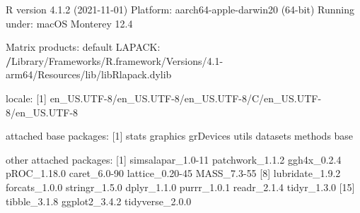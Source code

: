 \documentclass[
]{article}
\newenvironment{Shaded}{\begin{snugshade}}{\end{snugshade}}
\newcommand{\DecValTok}[1]{\textcolor[rgb]{0.00,0.00,0.81}{#1}}
\newcommand{\ErrorTok}[1]{\textcolor[rgb]{0.64,0.00,0.00}{\textbf{#1}}}
\newcommand{\FloatTok}[1]{\textcolor[rgb]{0.00,0.00,0.81}{#1}}
\newcommand{\FunctionTok}[1]{\textcolor[rgb]{0.00,0.00,0.00}{#1}}
\newcommand{\NormalTok}[1]{#1}
\newcommand{\SpecialCharTok}[1]{\textcolor[rgb]{0.00,0.00,0.00}{#1}}
\begin{document}
\begin{Shaded}
\begin{Highlighting}[]
\NormalTok{R version }\DecValTok{4}\NormalTok{.}\FloatTok{1.2}\NormalTok{ (}\DecValTok{2021{-}11{-}01}\NormalTok{)}
\NormalTok{Platform}\SpecialCharTok{:}\NormalTok{ aarch64}\SpecialCharTok{{-}}\NormalTok{apple}\SpecialCharTok{{-}}\FunctionTok{darwin20}\NormalTok{ (}\DecValTok{64}\SpecialCharTok{{-}}\NormalTok{bit)}
\NormalTok{Running under}\SpecialCharTok{:}\NormalTok{ macOS Monterey }\FloatTok{12.4}

\NormalTok{Matrix products}\SpecialCharTok{:}\NormalTok{ default}
\NormalTok{LAPACK}\SpecialCharTok{:} \ErrorTok{/}\NormalTok{Library}\SpecialCharTok{/}\NormalTok{Frameworks}\SpecialCharTok{/}\NormalTok{R.framework}\SpecialCharTok{/}\NormalTok{Versions}\SpecialCharTok{/}\FloatTok{4.1}\SpecialCharTok{{-}}\NormalTok{arm64}\SpecialCharTok{/}\NormalTok{Resources}\SpecialCharTok{/}\NormalTok{lib}\SpecialCharTok{/}\NormalTok{libRlapack.dylib}

\NormalTok{locale}\SpecialCharTok{:}
\NormalTok{[}\DecValTok{1}\NormalTok{] en\_US.UTF}\DecValTok{{-}8}\SpecialCharTok{/}\NormalTok{en\_US.UTF}\DecValTok{{-}8}\SpecialCharTok{/}\NormalTok{en\_US.UTF}\DecValTok{{-}8}\SpecialCharTok{/}\NormalTok{C}\SpecialCharTok{/}\NormalTok{en\_US.UTF}\DecValTok{{-}8}\SpecialCharTok{/}\NormalTok{en\_US.UTF}\DecValTok{{-}8}

\NormalTok{attached base packages}\SpecialCharTok{:}
\NormalTok{[}\DecValTok{1}\NormalTok{] stats     graphics  grDevices utils     datasets  methods   base     }

\NormalTok{other attached packages}\SpecialCharTok{:}
\NormalTok{ [}\DecValTok{1}\NormalTok{] simsalapar\_1}\FloatTok{.0}\DecValTok{{-}11}\NormalTok{ patchwork\_1.}\FloatTok{1.2}\NormalTok{   ggh4x\_0.}\FloatTok{2.4}\NormalTok{       pROC\_1.}\FloatTok{18.0}\NormalTok{       caret\_6}\FloatTok{.0}\DecValTok{{-}90}\NormalTok{      lattice\_0}\FloatTok{.20}\DecValTok{{-}45}\NormalTok{   MASS\_7}\FloatTok{.3}\DecValTok{{-}55}      
\NormalTok{ [}\DecValTok{8}\NormalTok{] lubridate\_1.}\FloatTok{9.2}\NormalTok{   forcats\_1.}\FloatTok{0.0}\NormalTok{     stringr\_1.}\FloatTok{5.0}\NormalTok{     dplyr\_1.}\FloatTok{1.0}\NormalTok{       purrr\_1.}\FloatTok{0.1}\NormalTok{       readr\_2.}\FloatTok{1.4}\NormalTok{       tidyr\_1.}\FloatTok{3.0}      
\NormalTok{[}\DecValTok{15}\NormalTok{] tibble\_3.}\FloatTok{1.8}\NormalTok{      ggplot2\_3.}\FloatTok{4.2}\NormalTok{     tidyverse\_2.}\FloatTok{0.0}  


\end{Highlighting}
\end{Shaded}
\end{document}
